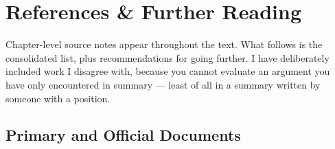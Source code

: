 \chapter{References \& Further Reading}

Chapter-level source notes appear throughout the text. What follows is the consolidated list, plus
recommendations for going further. I have deliberately included work I disagree with, because you
cannot evaluate an argument you have only encountered in summary --- least of all in a summary written
by someone with a position.

\begingroup
\setlength{\parskip}{3.5pt}

\section*{Primary and Official Documents}

